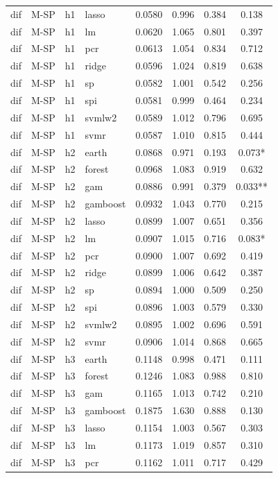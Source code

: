 \begin{ThreePartTable}
\begin{longtable}[t]{llclcccc}
dif & M-SP & h1 & lasso & 0.0580 & 0.996 & 0.384 & 0.138\\
dif & M-SP & h1 & lm & 0.0620 & 1.065 & 0.801 & 0.397\\
dif & M-SP & h1 & pcr & 0.0613 & 1.054 & 0.834 & 0.712\\
dif & M-SP & h1 & ridge & 0.0596 & 1.024 & 0.819 & 0.638\\
dif & M-SP & h1 & sp & 0.0582 & 1.001 & 0.542 & 0.256\\
dif & M-SP & h1 & spi & 0.0581 & 0.999 & 0.464 & 0.234\\
dif & M-SP & h1 & svmlw2 & 0.0589 & 1.012 & 0.796 & 0.695\\
dif & M-SP & h1 & svmr & 0.0587 & 1.010 & 0.815 & 0.444\\
\addlinespace
dif & M-SP & h2 & earth & 0.0868 & 0.971 & 0.193 & 0.073*\\
dif & M-SP & h2 & forest & 0.0968 & 1.083 & 0.919 & 0.632\\
dif & M-SP & h2 & gam & 0.0886 & 0.991 & 0.379 & 0.033**\\
dif & M-SP & h2 & gamboost & 0.0932 & 1.043 & 0.770 & 0.215\\
dif & M-SP & h2 & lasso & 0.0899 & 1.007 & 0.651 & 0.356\\
dif & M-SP & h2 & lm & 0.0907 & 1.015 & 0.716 & 0.083*\\
dif & M-SP & h2 & pcr & 0.0900 & 1.007 & 0.692 & 0.419\\
dif & M-SP & h2 & ridge & 0.0899 & 1.006 & 0.642 & 0.387\\
dif & M-SP & h2 & sp & 0.0894 & 1.000 & 0.509 & 0.250\\
dif & M-SP & h2 & spi & 0.0896 & 1.003 & 0.579 & 0.330\\
dif & M-SP & h2 & svmlw2 & 0.0895 & 1.002 & 0.696 & 0.591\\
dif & M-SP & h2 & svmr & 0.0906 & 1.014 & 0.868 & 0.665\\
\addlinespace
dif & M-SP & h3 & earth & 0.1148 & 0.998 & 0.471 & 0.111\\
dif & M-SP & h3 & forest & 0.1246 & 1.083 & 0.988 & 0.810\\
dif & M-SP & h3 & gam & 0.1165 & 1.013 & 0.742 & 0.210\\
dif & M-SP & h3 & gamboost & 0.1875 & 1.630 & 0.888 & 0.130\\
dif & M-SP & h3 & lasso & 0.1154 & 1.003 & 0.567 & 0.303\\
dif & M-SP & h3 & lm & 0.1173 & 1.019 & 0.857 & 0.310\\
dif & M-SP & h3 & pcr & 0.1162 & 1.011 & 0.717 & 0.429\\

\end{longtable}
\end{ThreePartTable}
